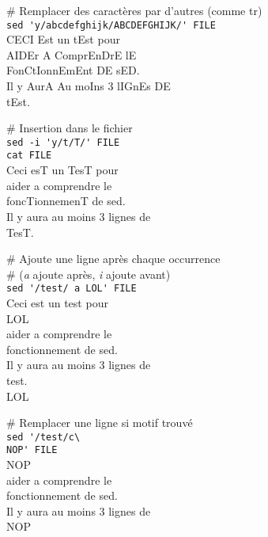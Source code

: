 \documentclass[10pt,landscape]{article}
\begin{document}
\begin{multicols}{3}
\smallskip

\# Remplacer des caractères par d'autres (comme tr)\\
\verb!sed 'y/abcdefghijk/ABCDEFGHIJK/' FILE!\\
\textrightarrow CECI Est un tEst pour\\
\textrightarrow AIDEr A ComprEnDrE lE\\
\textrightarrow FonCtIonnEmEnt DE sED.\\
\textrightarrow Il y AurA Au moIns 3 lIGnEs DE\\
\textrightarrow tEst.\\

\smallskip

\# Insertion dans le fichier\\
\verb!sed -i 'y/t/T/' FILE!\\
\verb!cat FILE!\\
\textrightarrow Ceci esT un TesT pour\\
\textrightarrow aider a comprendre le\\
\textrightarrow foncTionnemenT de sed.\\
\textrightarrow Il y aura au moins 3 lignes de\\
\textrightarrow TesT.\\

\smallskip

\# Ajoute une ligne après chaque occurrence\\
\# (\textit{a} ajoute après, \textit{i} ajoute avant)\\
\verb!sed '/test/ a LOL' FILE!\\
\textrightarrow Ceci est un test pour\\
\textrightarrow LOL\\
\textrightarrow aider a comprendre le\\
\textrightarrow fonctionnement de sed.\\
\textrightarrow Il y aura au moins 3 lignes de\\
\textrightarrow test.\\
\textrightarrow LOL\\

\smallskip

\# Remplacer une ligne si motif trouvé\\
\verb!sed '/test/c\!\\
\verb!NOP' FILE!\\
\textrightarrow NOP\\
\textrightarrow aider a comprendre le\\
\textrightarrow fonctionnement de sed.\\
\textrightarrow Il y aura au moins 3 lignes de\\
\textrightarrow NOP\\


\end{multicols}
\end{document}
